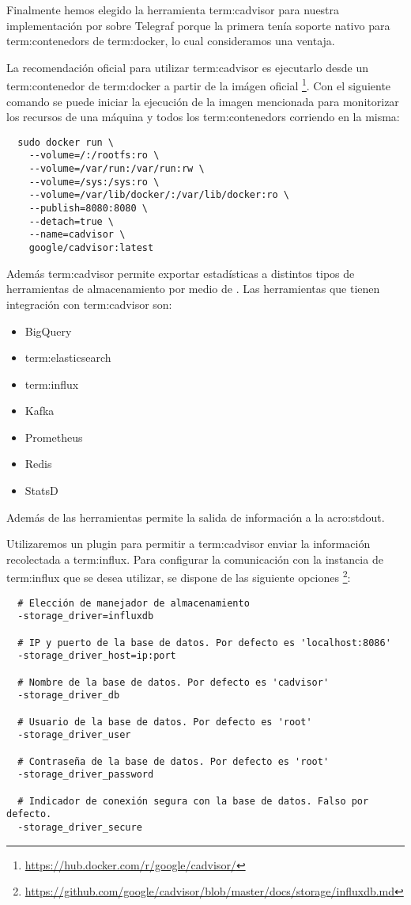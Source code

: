 Finalmente hemos elegido la herramienta \gls{term:cadvisor} para nuestra
implementación por sobre Telegraf porque la primera tenía soporte nativo para
\glspl{term:contenedor} de \gls{term:docker}, lo cual consideramos una ventaja.

La recomendación oficial para utilizar \gls{term:cadvisor} es ejecutarlo desde
un \gls{term:contenedor} de \gls{term:docker} a partir de la imágen oficial
\footnote{\url{https://hub.docker.com/r/google/cadvisor/}}. Con el siguiente
comando se puede iniciar la ejecución de la imagen mencionada para monitorizar
los recursos de una máquina y todos los \glspl{term:contenedor} corriendo en la
misma:

\begin{lstlisting}
  sudo docker run \
    --volume=/:/rootfs:ro \
    --volume=/var/run:/var/run:rw \
    --volume=/sys:/sys:ro \
    --volume=/var/lib/docker/:/var/lib/docker:ro \
    --publish=8080:8080 \
    --detach=true \
    --name=cadvisor \
    google/cadvisor:latest
\end{lstlisting}


Además \gls{term:cadvisor} permite exportar estadísticas a distintos tipos de
herramientas de almacenamiento por medio de . Las herramientas que
tienen integración con \gls{term:cadvisor} son:

\begin{itemize}
  \item BigQuery
  \item \gls{term:elasticsearch}
  \item \gls{term:influx}
  \item Kafka
  \item Prometheus
  \item Redis
  \item StatsD
\end{itemize}

Además de las herramientas permite la salida de información a la
\gls{acro:stdout}.

Utilizaremos un plugin para permitir a \gls{term:cadvisor} enviar la
información recolectada a \gls{term:influx}. Para configurar la comunicación
con la instancia de \gls{term:influx} que se desea utilizar, se dispone de las
siguiente opciones
\footnote{\url{https://github.com/google/cadvisor/blob/master/docs/storage/influxdb.md}}:

\begin{lstlisting}
  # Elección de manejador de almacenamiento
  -storage_driver=influxdb

  # IP y puerto de la base de datos. Por defecto es 'localhost:8086'
  -storage_driver_host=ip:port

  # Nombre de la base de datos. Por defecto es 'cadvisor'
  -storage_driver_db

  # Usuario de la base de datos. Por defecto es 'root'
  -storage_driver_user

  # Contraseña de la base de datos. Por defecto es 'root'
  -storage_driver_password

  # Indicador de conexión segura con la base de datos. Falso por defecto.
  -storage_driver_secure
\end{lstlisting}


